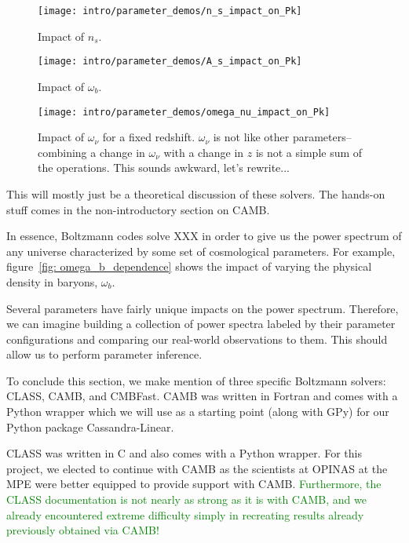 \begin{figure}[htb]
  \centering
  \texttt{[image: intro/parameter\_demos/n\_s\_impact\_on\_Pk]}
  \caption[Impact of $n_s$ on $P(k)$]{Impact of $n_s$.}
  \label{fig: n_s_dependence}
\end{figure}

\begin{figure}[htb]
  \centering
  \texttt{[image: intro/parameter\_demos/A\_s\_impact\_on\_Pk]}
  \caption[Impact of $\omega_b$ on $P(k)$]{Impact of $\omega_b$.}
  \label{fig: A_s_dependence}
\end{figure}

\begin{figure}[htb]
  \centering
  \texttt{[image: intro/parameter\_demos/omega\_nu\_impact\_on\_Pk]}
  \caption[Impact of $\omega_\nu$ on $P(k)$]{Impact of $\omega_\nu$ for a
  	fixed redshift. $\omega_\nu$ is not like other parameters--combining
  	a change in $\omega_\nu$ with a change in $z$ is not a simple sum of the
  	operations. This sounds awkward, let's rewrite...}
  \label{fig: omega_nu_dependence}
\end{figure}



This will mostly just be a theoretical discussion of these solvers. The hands-on stuff comes in the non-introductory section on CAMB.


In essence, Boltzmann codes solve XXX in order to give us the power spectrum
of any universe characterized by some set of cosmological parameters. For
example, figure~\ref{fig: omega_b_dependence} shows the impact of varying the
physical density in baryons, $\omega_b$. 

Several parameters have fairly unique impacts on the power spectrum.
Therefore, we can imagine building a collection of power spectra labeled by
their parameter configurations and comparing our real-world observations to
them. This should allow us to perform parameter inference.

To conclude this section, we make mention of three specific Boltzmann solvers: 
CLASS, CAMB, and CMBFast.
CAMB was written in Fortran and comes with a Python wrapper which we
will use as a starting point (along with GPy) for our Python package
Cassandra-Linear.

CLASS was written in C and also comes with a Python wrapper.
For this project, we elected to continue with CAMB as the scientists at
OPINAS at the MPE were better equipped to provide support with CAMB.
\textcolor{green}{Furthermore, the CLASS documentation
is not nearly as strong as it is with CAMB, and we already encountered
extreme difficulty simply in recreating results already previously obtained
via CAMB!}

